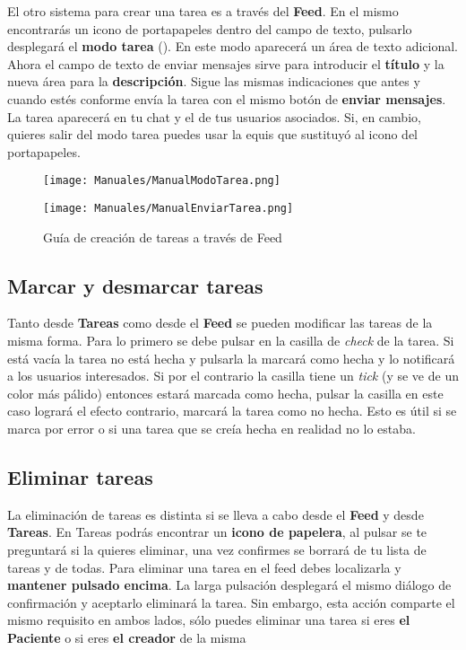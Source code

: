 El otro sistema para crear una tarea es a través del \textbf{Feed}. En el mismo encontrarás un icono de portapapeles dentro del campo de texto, pulsarlo desplegará el \textbf{modo tarea} (). En este modo aparecerá un área de texto adicional. Ahora el campo de texto de enviar mensajes sirve para introducir el \textbf{título} y la nueva área para la \textbf{descripción}. Sigue las mismas indicaciones que antes y cuando estés conforme envía la tarea con el mismo botón de \textbf{enviar mensajes}. La tarea aparecerá en tu chat y el de tus usuarios asociados. Si, en cambio, quieres salir del modo tarea puedes usar la equis que sustituyó al icono del portapapeles.

\begin{figure}[H]
    \centering
    \begin{minipage}{0.5\textwidth}
        \centering
        \texttt{[image: Manuales/ManualModoTarea.png]}
    \end{minipage}\hfill
    \begin{minipage}{0.5\textwidth}
        \centering
        \texttt{[image: Manuales/ManualEnviarTarea.png]}
    \end{minipage}\hfill
    \caption{Guía de creación de tareas a través de Feed}
    \label{man:enviar_tarea}
\end{figure}

\subsection{Marcar y desmarcar tareas}

Tanto desde \textbf{Tareas} como desde el \textbf{Feed} se pueden modificar las tareas de la misma forma. Para lo primero se debe pulsar en la casilla de \emph{check} de la tarea. Si está vacía la tarea no está hecha y pulsarla la marcará como hecha y lo notificará a los usuarios interesados. Si por el contrario la casilla tiene un \emph{tick} (y se ve de un color más pálido) entonces estará marcada como hecha, pulsar la casilla en este caso logrará el efecto contrario, marcará la tarea como no hecha. Esto es útil si se marca por error o si una tarea que se creía hecha en realidad no lo estaba.

\subsection{Eliminar tareas}

La eliminación de tareas es distinta si se lleva a cabo desde el \textbf{Feed} y desde \textbf{Tareas}. En Tareas podrás encontrar un \textbf{icono  de papelera}, al pulsar se te preguntará si la quieres eliminar, una vez confirmes se borrará de tu lista de tareas y de todas. Para eliminar una tarea en el feed debes localizarla y \textbf{mantener pulsado encima}. La larga pulsación desplegará el mismo diálogo de confirmación y aceptarlo eliminará la tarea. Sin embargo, esta acción comparte el mismo requisito en ambos lados, sólo puedes eliminar una tarea si eres \textbf{el Paciente} o si eres \textbf{el creador} de la misma

